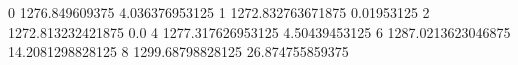 0 1276.849609375 4.036376953125
1 1272.832763671875 0.01953125
2 1272.813232421875 0.0
4 1277.317626953125 4.50439453125
6 1287.0213623046875 14.2081298828125
8 1299.68798828125 26.874755859375
